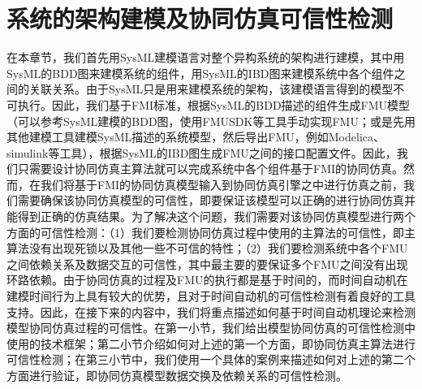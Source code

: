 \chapter{系统的架构建模及协同仿真可信性检测}
\label{ch3}
在本章节，我们首先用SysML建模语言对整个异构系统的架构进行建模，其中用SysML的BDD图来建模系统的组件，用SysML的IBD图来建模系统中各个组件之间的关联关系。由于SysML只是用来建模系统的架构，该建模语言得到的模型不可执行。因此，我们基于FMI标准，根据SysML的BDD描述的组件生成FMU模型（可以参考SysML建模的BDD图，使用FMUSDK等工具手动实现FMU；或是先用其他建模工具建模SysML描述的系统模型，然后导出FMU，例如Modelica、simulink等工具），根据SysML的IBD图生成FMU之间的接口配置文件。因此，我们只需要设计协同仿真主算法就可以完成系统中各个组件基于FMI的协同仿真。然而，在我们将基于FMI的协同仿真模型输入到协同仿真引擎之中进行仿真之前，我们需要确保该协同仿真模型的可信性，即要保证该模型可以正确的进行协同仿真并能得到正确的仿真结果。为了解决这个问题，我们需要对该协同仿真模型进行两个方面的可信性检测：（1）我们要检测协同仿真过程中使用的主算法的可信性，即主算法没有出现死锁以及其他一些不可信的特性；（2）我们要检测系统中各个FMU之间依赖关系及数据交互的可信性，其中最主要的要保证多个FMU之间没有出现环路依赖\cite{Broman2013Determinate}。由于协同仿真的过程及FMU的执行都是基于时间的，而时间自动机在建模时间行为上具有较大的优势，且对于时间自动机的可信性检测有着良好的工具支持。因此，在接下来的内容中，我们将重点描述如何基于时间自动机理论来检测模型协同仿真过程的可信性。在第一小节，我们给出模型协同仿真的可信性检测中使用的技术框架；第二小节介绍如何对上述的第一个方面，即协同仿真主算法进行可信性检测；在第三小节中，我们使用一个具体的案例来描述如何对上述的第二个方面进行验证，即协同仿真模型数据交换及依赖关系的可信性检测。
